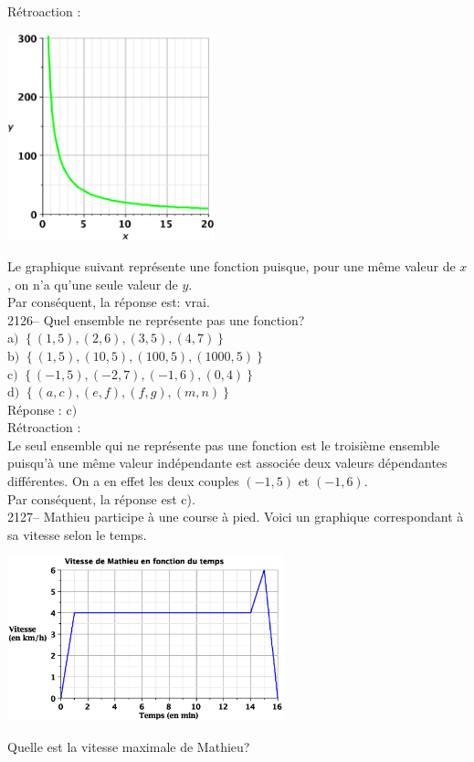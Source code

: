 \documentclass[letterpaper, 12pt]{article}
\begin{document}
R\'etroaction :\\
\begin{center}
 \includegraphics[width=6cm,bb=20 118 575 673]{Q2125.eps}
\end{center}
Le graphique suivant repr\'esente une fonction puisque, pour une m\^eme valeur de $x$, on n'a qu'une seule valeur de $y$.\\
Par cons\'equent, la r\'eponse est: vrai. \\

2126-- Quel ensemble ne repr\'esente pas une fonction?\\

a$)$  $\left\lbrace  (1, 5), (2, 6), (3, 5), (4, 7)\right\rbrace$ \\
b$)$  $\left\lbrace(1, 5), (10, 5), (100, 5), (1000, 5)\right\rbrace$ \\
c$)$  $\left\lbrace(-1, 5), (-2, 7), (-1, 6), (0, 4)\right\rbrace$ \\
d$)$  $\left\lbrace(a, c), (e, f), (f, g), (m, n)\right\rbrace$ \\

R\'eponse : c$)$\\

R\'etroaction :\\
Le seul ensemble qui ne repr\'esente pas une fonction est le troisi\`eme ensemble puisqu'\`a une m\^eme valeur ind\'ependante est associ\'ee deux valeurs d\'ependantes diff\'erentes. On a en effet les deux couples $(-1, 5)$ et $(-1, 6)$.\\
Par cons\'equent, la r\'eponse est c).\\

2127-- Mathieu participe \`a une course \`a pied. Voici un graphique correspondant \`a sa vitesse selon le temps.
\begin{center}
 \includegraphics[width=8cm,bb=20 209 575 582]{Q2127.eps}
\end{center}
Quelle est la vitesse maximale de Mathieu?
\end{document}
